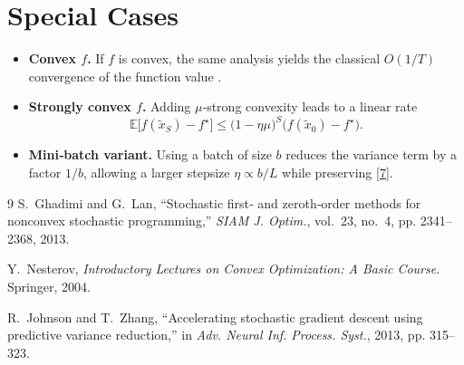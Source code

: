 \documentclass[11pt]{article}
\newcommand{\E}{\mathbb{E}}
\begin{document}
\section*{Special Cases}
\begin{itemize}
\item \textbf{Convex $f$.} If $f$ is convex, the same analysis yields the classical $O(1/T)$ convergence of the function value \cite{johnson2013accelerating}.
\item \textbf{Strongly convex $f$.} Adding $\mu$‑strong convexity leads to a linear rate
\[
\E\!\bigl[f(\tilde{x}_S)-f^\star\bigr]\le\bigl(1-\eta\mu\bigr)^{S} \bigl(f(\tilde{x}_0)-f^\star\bigr).
\]
\item \textbf{Mini‑batch variant.} Using a batch of size $b$ reduces the variance term by a factor $1/b$, allowing a larger stepsize $\eta\propto b/L$ while preserving \eqref{7}.
\end{itemize}

\begin{thebibliography}{9}
S.~Ghadimi and G.~Lan, ``Stochastic first‑ and zeroth‑order methods for nonconvex stochastic programming,'' \emph{SIAM J. Optim.}, vol.~23, no.~4, pp. 2341–2368, 2013.

Y.~Nesterov, \emph{Introductory Lectures on Convex Optimization: A Basic Course}. Springer, 2004.

R.~Johnson and T.~Zhang, ``Accelerating stochastic gradient descent using predictive variance reduction,'' in \emph{Adv. Neural Inf. Process. Syst.}, 2013, pp. 315–323.
\end{thebibliography}
\end{document}
